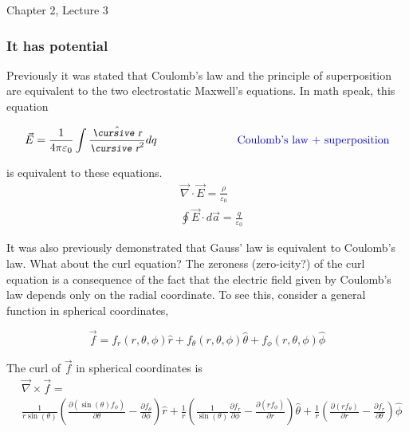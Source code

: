 \documentclass[12pt]{article}
\begin{document}
\begin{flushright} {\color{blue} Chapter 2, Lecture 3} \end{flushright}
\begin{flushleft}

\subsubsection*{\bf It has potential}

Previously it was stated that Coulomb's law and the principle of superposition are equivalent to the two electrostatic Maxwell's equations.  In math speak, this equation

\begin{equation*}
\begin{aligned}
& \vec{E}=\frac{1}{4\pi \varepsilon_{0}} \int \frac{ \hat{\text{\small\slshape\cursive r}} }{\text{\small\slshape\cursive r}^{2}} dq \hspace{1.in} \mbox{\color{myblue} Coulomb's law + superposition} \\
\end{aligned}
\end{equation*}

is equivalent to these equations.
\begin{equation*}
\begin{aligned}
& \vec{\nabla} \cdot \vec{E} = \frac{\rho}{\varepsilon_{0}} \\
& \oint \vec{E} \cdot d\vec{a} = \frac{q}{\varepsilon_{0}} 
\end{aligned}
\end{equation*}

It was also previously demonstrated that Gauss' law is equivalent to Coulomb's law.  What about the curl equation?  The zeroness (zero-icity?) of the curl equation is a consequence of the fact that the electric field given by Coulomb's law depends only on the radial coordinate.  To see this, consider a general function in spherical coordinates,

\[
\vec{f} = f_{r}(r,\theta,\phi)\hat{r} + f_{\theta}(r,\theta,\phi)\hat{\theta} + f_{\phi}(r,\theta,\phi)\hat{\phi} 
\]

\vspace{.1in}
The curl of $\vec{f}$ in spherical coordinates is
\begin{equation*}
\begin{aligned}
& \vec{\nabla} \times \vec{f}  = \\
& \frac{1}{ r\sin{(\theta)} } \left( \frac{\partial (\sin{(\theta)}f_{\phi}) }{\partial \theta}-\frac{\partial f_{\theta}}{\partial \phi} \right)\hat{r}
+\frac{1}{r} 
\left( \frac{1}{\sin{(\theta)}}\frac{\partial f_{r} }{\partial \phi} -\frac{\partial (rf_{\phi}) }{\partial r} \right) \hat{\theta} 
  + \frac{1}{r} \left( \frac{\partial (rf_{\theta}) }{\partial r}-\frac{\partial f_{r}}{\partial \theta} \right)\hat{\phi}
\end{aligned}
\end{equation*}


\end{flushleft}
\end{document}
